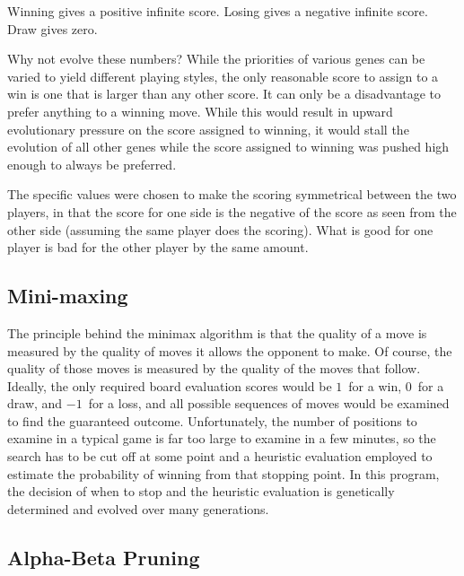 \documentclass[letterpaper]{article}
\renewcommand{\_}{\allowbreak\textunderscore\allowbreak}
\begin{document}
Winning gives a positive infinite score.
Losing gives a negative infinite score.
Draw gives zero.

Why not evolve these numbers? While the priorities of various genes can be varied to yield different playing styles, the only reasonable score to assign to a win is one that is larger than any other score. It can only be a disadvantage to prefer anything to a winning move. While this would result in upward evolutionary pressure on the score assigned to winning, it would stall the evolution of all other genes while the score assigned to winning was pushed high enough to always be preferred.

The specific values were chosen to make the scoring symmetrical between the two players, in that the score for one side is the negative of the score as seen from the other side (assuming the same player does the scoring). What is good for one player is bad for the other player by the same amount.

\subsection{Mini-maxing}

The principle behind the minimax algorithm is that the quality of a move is measured by the quality of moves it allows the opponent to make. Of course, the quality of those moves is measured by the quality of the moves that follow. Ideally, the only required board evaluation scores would be \(1\)~for a win, \(0\)~for a draw, and \(-1\)~for a loss, and all possible sequences of moves would be examined to find the guaranteed outcome. Unfortunately, the number of positions to examine in a typical game is far too large to examine in a few minutes, so the search has to be cut off at some point and a heuristic evaluation employed to estimate the probability of winning from that stopping point. In this program, the decision of when to stop and the heuristic evaluation is genetically determined and evolved over many generations.

\subsection{Alpha-Beta Pruning}
\end{document}
